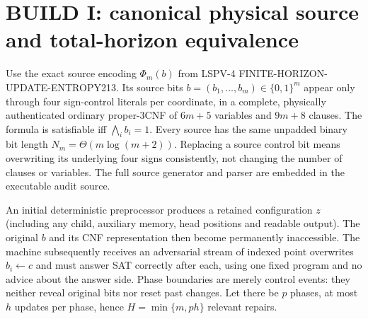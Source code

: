 \documentclass[11pt]{article}
\begin{document}
\section{BUILD I: canonical physical source and total-horizon equivalence}
Use the exact source encoding $\Phi_m(b)$ from LSPV-4 FINITE-HORIZON-UPDATE-ENTROPY213. Its source bits $b=(b_1,\dots,b_m)\in\{0,1\}^m$ appear only through four sign-control literals per coordinate, in a complete, physically authenticated ordinary proper-3CNF of $6m+5$ variables and $9m+8$ clauses. The formula is satisfiable iff $\bigwedge_i b_i=1$. Every source has the same unpadded binary bit length $N_m=\Theta(m\log(m+2))$. Replacing a source control bit means overwriting its underlying four signs consistently, not changing the number of clauses or variables. The full source generator and parser are embedded in the executable audit source.

An initial deterministic preprocessor produces a retained configuration $z$ (including any child, auxiliary memory, head positions and readable output). The original $b$ and its CNF representation then become permanently inaccessible. The machine subsequently receives an adversarial stream of indexed point overwrites $b_i\leftarrow c$ and must answer SAT correctly after each, using one fixed program and no advice about the answer side. Phase boundaries are merely control events: they neither reveal original bits nor reset past changes. Let there be $p$ phases, at most $h$ updates per phase, hence $H=\min\{m,ph\}$ relevant repairs.
\end{document}
